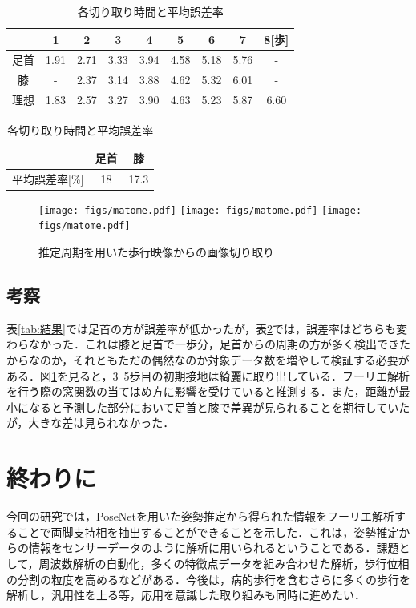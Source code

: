 \documentclass[a4j,10.5pt]{jreport}
\begin{document}
\begin{table}[H]
    \centering
    \begin{tabular}{c|cccccccc}
     & 1 & 2 & 3 & 4 & 5 & 6 & 7 & 8[歩] \\ \hline
足首 &1.91&2.71&3.33&3.94&4.58&5.18&5.76&-\\ \hline
膝   &-&2.37&3.14&3.88&4.62&5.32&6.01&-\\ \hline
理想 &1.83&2.57&3.27&3.90&4.63&5.23&5.87&6.60\\ \hline
    \end{tabular}
    \vspace{5mm}
    \newline
    \begin{tabular}{c||cc}
         &  足首&膝\\ \hline
        平均誤差率[\%] & 18&17.3 \\ \hline
    \end{tabular}
    \caption{各切り取り時間と平均誤差率}
    \label{tab:aveerror}
\end{table}
\begin{figure}
    \centering
    \caption{推定周期を用いた歩行映像からの画像切り取り}
    \texttt{[image: figs/matome.pdf]}
    \texttt{[image: figs/matome.pdf]}
    \texttt{[image: figs/matome.pdf]}

    \label{fig:matome}
\end{figure}
\section{考察}
表\ref{tab:結果}では足首の方が誤差率が低かったが，表\ref{tab:aveerror}では，誤差率はどちらも変わらなかった．これは膝と足首で一歩分，足首からの周期の方が多く検出できたからなのか，それともただの偶然なのか対象データ数を増やして検証する必要がある．図\ref{fig:matome}を見ると，3~5歩目の初期接地は綺麗に取り出している．フーリエ解析を行う際の窓関数の当てはめ方に影響を受けていると推測する．また，距離が最小になると予測した部分において足首と膝で差異が見られることを期待していたが，大きな差は見られなかった．
\chapter{終わりに}
今回の研究では，PoseNetを用いた姿勢推定から得られた情報をフーリエ解析することで両脚支持相を抽出することができることを示した．これは，姿勢推定からの情報をセンサーデータのように解析に用いられるということである．課題として，周波数解析の自動化，多くの特徴点データを組み合わせた解析，歩行位相の分割の粒度を高めるなどがある．今後は，病的歩行を含むさらに多くの歩行を解析し，汎用性を上る等，応用を意識した取り組みも同時に進めたい．
\end{document}
